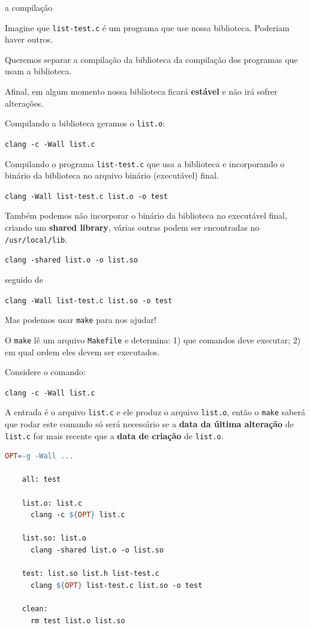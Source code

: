 \documentclass{beamer}
\begin{document}
\begin{frame}{a compilação}

  Imagine que \texttt{list-test.c} é um programa que use nossa
  biblioteca. Poderiam haver outros.

  Queremos separar a compilação da biblioteca da compilação dos programas que usam a biblioteca.

  Afinal, em algum momento nossa biblioteca ficará \textbf{estável} e
  não irá sofrer alterações.

  \framebreak

  Compilando a biblioteca geramos o \texttt{list.o}:

  \texttt{clang -c -Wall list.c}

  Compilando o programa \texttt{list-test.c} que usa a biblioteca e
  incorporando o binário da biblioteca no arquivo binário (executável)
  final.
  
  \texttt{clang -Wall list-test.c list.o -o test}

  \framebreak

  Também podemos não incorporar o binário da biblioteca no executável
  final, criando um \textbf{shared library}, várias outras podem ser
  encontradas no \texttt{/usr/local/lib}.

  \texttt{clang -shared list.o -o list.so}

  seguido de

  \texttt{clang -Wall list-test.c list.so -o test}

  \framebreak

  Mas podemos usar \texttt{make} para nos ajudar!

  O \texttt{make} lê um arquivo \texttt{Makefile} e determina: 1) que
  comandos deve executar; 2) em qual ordem eles devem ser executados.

  Considere o comando:

  \texttt{clang -c -Wall list.c}

  A entrada é o arquivo \texttt{list.c} e ele produz o arquivo
  \texttt{list.o}, então o \texttt{make} saberá que rodar este comando
  só será necessário se a \textbf{data da última alteração} de
  \texttt{list.c} for mais recente que a \textbf{data de criação} de
  \texttt{list.o}.

  \framebreak

  \begin{lstlisting}[style=code,language=make,caption=Makefile]
    OPT=-g -Wall ...

    all: test

    list.o: list.c
      clang -c ${OPT} list.c

    list.so: list.o
      clang -shared list.o -o list.so

    test: list.so list.h list-test.c
      clang ${OPT} list-test.c list.so -o test

    clean:
      rm test list.o list.so
  \end{lstlisting}
  
\end{frame}
\end{document}

